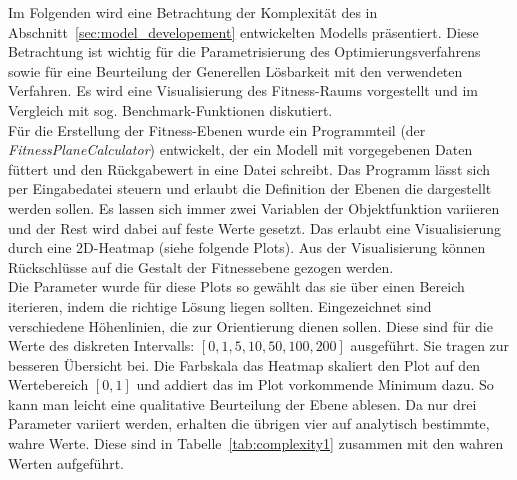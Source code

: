 %
Im Folgenden wird eine Betrachtung der Komplexität des in Abschnitt~\ref{sec:model_developement} entwickelten Modells präsentiert. Diese Betrachtung ist wichtig für die Parametrisierung des Optimierungsverfahrens sowie für eine Beurteilung der Generellen Lösbarkeit mit den verwendeten Verfahren. Es wird eine Visualisierung des Fitness-Raums vorgestellt und im Vergleich mit sog. Benchmark-Funktionen diskutiert.\\
%

Für die Erstellung der Fitness-Ebenen wurde ein Programmteil (der \textit{FitnessPlaneCalculator}) entwickelt, der ein Modell mit vorgegebenen Daten füttert und den Rückgabewert in eine Datei schreibt. Das Programm lässt sich per Eingabedatei steuern und erlaubt die Definition der Ebenen die dargestellt werden sollen. Es lassen sich immer zwei Variablen der Objektfunktion variieren und der Rest wird dabei auf feste Werte gesetzt. Das erlaubt eine Visualisierung durch eine 2D-Heatmap (siehe folgende Plots). Aus der Visualisierung können Rückschlüsse auf die Gestalt der Fitnessebene gezogen werden.\\
%

Die Parameter wurde für diese Plots so gewählt das sie über einen Bereich iterieren, indem die richtige Lösung liegen sollten. Eingezeichnet sind verschiedene Höhenlinien, die zur Orientierung dienen sollen. Diese sind für die Werte des diskreten Intervalls: $[0,1,5,10,50,100,200]$ ausgeführt. Sie tragen zur besseren Übersicht bei. Die Farbskala das Heatmap skaliert den Plot auf den Wertebereich $[0,1]$ und addiert das im Plot vorkommende Minimum dazu. So kann man leicht eine qualitative Beurteilung der Ebene ablesen. Da nur drei Parameter variiert werden, erhalten die übrigen vier auf analytisch bestimmte, wahre Werte. Diese sind in Tabelle~\ref{tab:complexity1} zusammen mit den wahren Werten aufgeführt.\\

